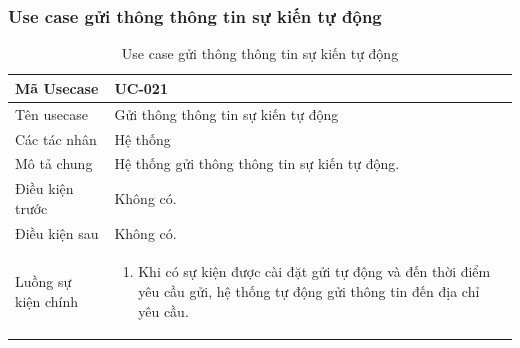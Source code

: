 \documentclass[12pt,a4paper]{article}
\begin{document}
    \subsubsection*{Use case gửi thông thông tin sự kiến tự động}
    \begin{table}[H]
        \centering
        \begin{tabular}{|p{3.5cm}|p{11.5cm}|c|}
            \hline
            Mã Usecase      & UC-021                                        \\
            \hline
            Tên usecase     & Gửi thông thông tin sự kiến tự động           \\
            \hline
            Các tác nhân    & Hệ thống                                      \\
            \hline
            Mô tả chung     & Hệ thống gửi thông thông tin sự kiến tự động. \\
            \hline

            Điều kiện trước & Không có.                                     \\
            \hline

            Điều kiện sau   & Không có.                                     \\
            \hline

            Luồng sự kiện chính & \vspace{-.8cm}\begin{enumerate}
                                                    \item Khi có sự kiện được cài đặt gửi tự động và đến thời điểm yêu cầu gửi, hệ thống tự động gửi thông tin đến địa chỉ yêu cầu.
            \end{enumerate}
            \\
            \hline
        \end{tabular}
        \caption{Use case gửi thông thông tin sự kiến tự động}

    \end{table}


\end{document}
